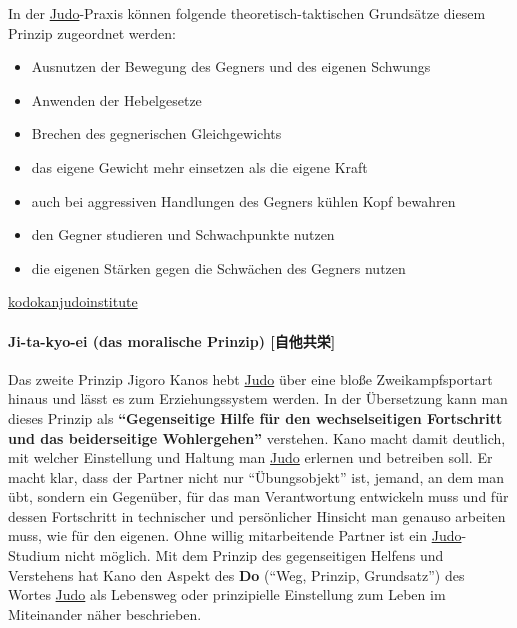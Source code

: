 \documentclass[justified, a4paper, notitlepage, captions=tableheading, nobib]{tufte-handout}
\begin{document}
In der \hyperref[org80c3996]{Judo}-Praxis können folgende theoretisch-taktischen Grundsätze diesem Prinzip zugeordnet werden: 
\begin{itemize}
\item Ausnutzen der Bewegung des Gegners und des eigenen Schwungs
\item Anwenden der Hebelgesetze
\item Brechen des gegnerischen Gleichgewichts
\item das eigene Gewicht mehr einsetzen als die eigene Kraft
\item auch bei aggressiven Handlungen des Gegners kühlen Kopf bewahren
\item den Gegner studieren und Schwachpunkte nutzen
\item die eigenen Stärken gegen die Schwächen des Gegners nutzen
\end{itemize}

\href{http://kodokanjudoinstitute.org/en/doctrine/word/seiryoku-zenyo/}{kodokanjudoinstitute}

\paragraph{\label{orga25107b}Ji-ta-kyo-ei (das moralische Prinzip) [自他共栄]}
\label{sec:org2d3480e}
Das zweite Prinzip Jigoro Kanos hebt \hyperref[org80c3996]{Judo} über eine bloße Zweikampfsportart hinaus und lässt es zum Erziehungssystem werden. In der Übersetzung kann man dieses Prinzip als \textbf{"`Gegenseitige Hilfe für den wechselseitigen Fortschritt und das beiderseitige Wohlergehen"'} verstehen. Kano macht damit deutlich, mit welcher Einstellung und Haltung man \hyperref[org80c3996]{Judo} erlernen und betreiben soll. Er macht klar, dass der Partner nicht nur "`Übungsobjekt"' ist, jemand, an dem man übt, sondern ein Gegenüber, für das man Verantwortung entwickeln muss und für dessen Fortschritt in technischer und persönlicher Hinsicht man genauso arbeiten muss, wie für den eigenen. Ohne willig mitarbeitende Partner ist ein \hyperref[org80c3996]{Judo}-Studium nicht möglich. Mit dem Prinzip des gegenseitigen Helfens und Verstehens hat Kano den Aspekt des \textbf{Do} ("`Weg, Prinzip, Grundsatz"') des Wortes \hyperref[org80c3996]{Judo} als Lebensweg oder prinzipielle Einstellung zum Leben im Miteinander näher beschrieben. 
\end{document}
